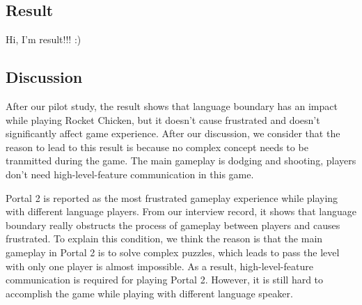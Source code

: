\subsection{Result}

Hi, I'm result!!! :)


\subsection{Discussion}

After our pilot study, the result shows that language boundary has an impact while playing Rocket Chicken, but it doesn't cause frustrated and doesn't significantly affect game experience. After our discussion, we consider that the reason to lead to this result is because no complex concept needs to be tranmitted during the game. The main gameplay is dodging and shooting, players don't need high-level-feature communication in this game.


Portal 2 is reported as the most frustrated gameplay experience while playing with different language players. From our interview record, it shows that language boundary really obstructs the process of gameplay between players and causes frustrated. To explain this condition, we think the reason is that the main gameplay in Portal 2 is to solve complex puzzles, which leads to pass the level with only one player is almost impossible. As a result, high-level-feature communication is required for playing Portal 2. However, it is still hard to accomplish the game while playing with different language speaker.



